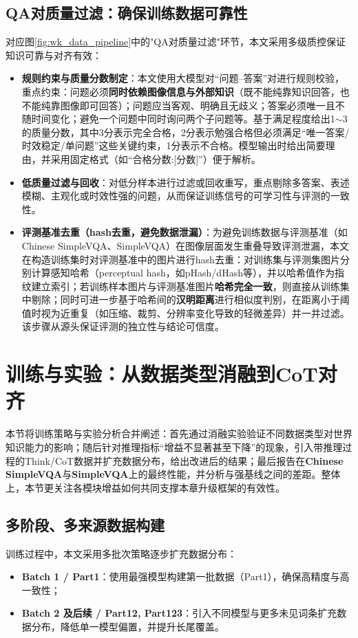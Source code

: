 \subsection{QA对质量过滤：确保训练数据可靠性}
对应图\ref{fig:wk_data_pipeline}中的"QA对质量过滤"环节，本文采用多级质控保证知识可靠与对齐有效：
\begin{itemize}
  \item \textbf{规则约束与质量分数制定}：本文使用大模型对“问题--答案”对进行规则校验，重点约束：问题必须\textbf{同时依赖图像信息与外部知识}（既不能纯靠知识回答，也不能纯靠图像即可回答）；问题应当客观、明确且无歧义；答案必须唯一且不随时间变化；避免一个问题中同时询问两个子问题等。基于满足程度给出1$\sim$3的质量分数，其中3分表示完全合格，2分表示勉强合格但必须满足“唯一答案/时效稳定/单问题”这些关键约束，1分表示不合格。模型输出时给出简要理由，并采用固定格式（如“合格分数:[分数]”）便于解析。
  \item \textbf{低质量过滤与回收}：对低分样本进行过滤或回收重写，重点剔除多答案、表述模糊、主观化或时效性强的问题，从而保证训练信号的可学习性与评测的一致性。
  \item \textbf{评测基准去重（hash去重，避免数据泄漏）}：为避免训练数据与评测基准（如Chinese SimpleVQA、SimpleVQA）在图像层面发生重叠导致评测泄漏，本文在构造训练集时对评测基准中的图片进行hash去重：对训练集与评测集图片分别计算感知哈希（perceptual hash，如pHash/dHash等），并以哈希值作为指纹建立索引；若训练样本图片与评测基准图片\textbf{哈希完全一致}，则直接从训练集中剔除；同时可进一步基于哈希间的\textbf{汉明距离}进行相似度判别，在距离小于阈值时视为近重复（如压缩、裁剪、分辨率变化导致的轻微差异）并一并过滤。该步骤从源头保证评测的独立性与结论可信度。
\end{itemize}

\section{训练与实验：从数据类型消融到CoT对齐}
本节将训练策略与实验分析合并阐述：首先通过消融实验验证不同数据类型对世界知识能力的影响；随后针对推理指标“增益不显著甚至下降”的现象，引入带推理过程的Think/CoT数据并扩充数据分布，给出改进后的结果；最后报告在\textbf{Chinese SimpleVQA}与\textbf{SimpleVQA}上的最终性能，并分析与强基线之间的差距。整体上，本节更关注各模块增益如何共同支撑本章升级框架的有效性。

\subsection{多阶段、多来源数据构建}
训练过程中，本文采用多批次策略逐步扩充数据分布：
\begin{itemize}
  \item \textbf{Batch 1 / Part1}：使用最强模型构建第一批数据（Part1），确保高精度与高一致性；
  \item \textbf{Batch 2 及后续 / Part12, Part123}：引入不同模型与更多未见词条扩充数据分布，降低单一模型偏置，并提升长尾覆盖。
\end{itemize}

